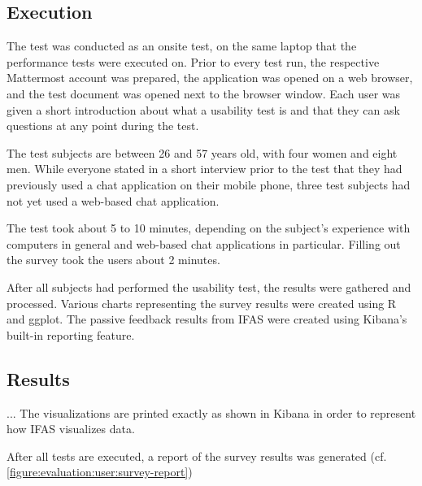 \subsection{Execution}

The test was conducted as an onsite test, on the same laptop that the performance tests were executed on.
Prior to every test run, the respective Mattermost account was prepared, the application was opened on a web browser, and the test document was opened next to the browser window.
Each user was given a short introduction about what a usability test is and that they can ask questions at any point during the test.

The test subjects are between 26 and 57 years old, with four women and eight men.
While everyone stated in a short interview prior to the test that they had previously used a chat application on their mobile phone, three test subjects had not yet used a web-based chat application.

The test took about 5 to 10 minutes, depending on the subject's experience with computers in general and web-based chat applications in particular.
Filling out the survey took the users about 2 minutes.

After all subjects had performed the usability test, the results were gathered and processed.
Various charts representing the survey results were created using R and ggplot.
The passive feedback results from \ac{IFAS} were created using Kibana's built-in reporting feature.

\subsection{Results}

...
The visualizations are printed exactly as shown in Kibana in order to represent how \ac{IFAS} visualizes data.

After all tests are executed, a report of the survey results was generated (cf. \cref{figure:evaluation:user:survey-report})

